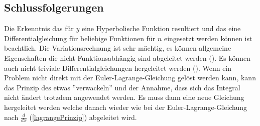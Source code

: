  \subsection{Schlussfolgerungen}
 Die Erkenntnis das für $y$ eine Hyperbolische Funktion resultiert und das eine Differentialgleichung für beliebige Funktionen für $n$ eingesetzt werden können ist beachtlich. Die Variationsrechnung ist sehr mächtig, es können allgemeine Eigenschaften die nicht Funktionsabhängig sind abgeleitet werden (). Es können auch nicht triviale Differentialgleichungen hergeleitet werden (). Wenn ein Problem nicht direkt mit der Euler-Lagrange-Gleichung gelöst werden kann, kann das Prinzip des etwas ''verwackeln'' und der Annahme, dass sich das Integral nicht ändert trotzdem angewendet werden. Es muss dann eine neue Gleichung hergeleitet werden welche danach wieder wie bei der Euler-Lagrange-Gleichung nach $\frac{d}{dx}$ (\eqref{lagrangePrinzip}) abgeleitet wird.